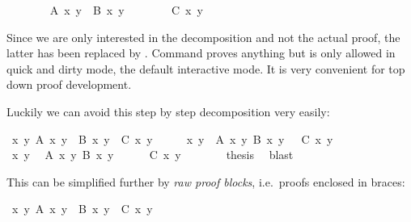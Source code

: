 \begin{isabellebody}
\ \ \ \ \ \ \isamarkupfalse%
\ {\isachardoublequote}A\ x\ y\ {\isasymand}\ B\ x\ y{\isachardoublequote}\isanewline
\ \ \ \ \ \ \isamarkupfalse%
\ {\isachardoublequote}C\ x\ y{\isachardoublequote}\ \isamarkupfalse%
\isanewline
\ \ \ \ \isamarkupfalse%
\isanewline
\ \ \isamarkupfalse%
\isanewline
\isamarkupfalse%
\isamarkupfalse%
%
\begin{isamarkuptext}%
\noindent Since we are only interested in the decomposition and not the
actual proof, the latter has been replaced by
. Command  proves anything but is
only allowed in quick and dirty mode, the default interactive mode. It
is very convenient for top down proof development.

Luckily we can avoid this step by step decomposition very easily:%
\end{isamarkuptext}%
\isamarkuptrue%
\ {\isachardoublequote}{\isasymforall}x\ y{\isachardot}\ A\ x\ y\ {\isasymand}\ B\ x\ y\ {\isasymlongrightarrow}\ C\ x\ y{\isachardoublequote}\isanewline
\isamarkupfalse%
\ {\isacharminus}\isanewline
\ \ \isamarkupfalse%
\ {\isachardoublequote}{\isasymAnd}x\ y{\isachardot}\ {\isasymlbrakk}\ A\ x\ y{\isacharsemicolon}\ B\ x\ y\ {\isasymrbrakk}\ {\isasymLongrightarrow}\ C\ x\ y{\isachardoublequote}\isanewline
\ \ \isamarkupfalse%
\ {\isacharminus}\isanewline
\ \ \ \ \isamarkupfalse%
\ x\ y\ \isamarkupfalse%
\ {\isachardoublequote}A\ x\ y{\isachardoublequote}\ {\isachardoublequote}B\ x\ y{\isachardoublequote}\isanewline
\ \ \ \ \isamarkupfalse%
\ {\isachardoublequote}C\ x\ y{\isachardoublequote}\ \isamarkupfalse%
\isanewline
\ \ \isamarkupfalse%
\isanewline
\ \ \isamarkupfalse%
\ {\isacharquery}thesis\ \isamarkupfalse%
\ blast\isanewline
\isamarkupfalse%
\isamarkupfalse%
%
\begin{isamarkuptext}%
\noindent
This can be simplified further by \emph{raw proof blocks}, i.e.\
proofs enclosed in braces:%
\end{isamarkuptext}%
\isamarkuptrue%
\ {\isachardoublequote}{\isasymforall}x\ y{\isachardot}\ A\ x\ y\ {\isasymand}\ B\ x\ y\ {\isasymlongrightarrow}\ C\ x\ y{\isachardoublequote}\isanewline
\isamarkupfalse%
\ {\isacharminus}\isanewline
\ \ \isamarkupfalse%
\isacommand{{\isacharbraceleft}}\ \isamarkupfalse%

\end{isabellebody}
